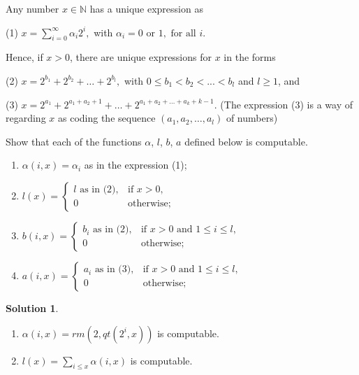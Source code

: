 \documentclass[12pt,a4paper]{article}
\theoremstyle{definition}
\newtheorem*{solution}{Solution}
\numberwithin{equation}{section}
\numberwithin{figure}{section}
\begin{document}
\begin{enumerate}
  Any number $x \in \mathbb{N}$ has a unique expression as

  (1) $x=\sum\limits_{i=0}^{\infty} \alpha_{i}2^{i},$ with $\alpha_{i}=0 \mbox{ or } 1,\mbox{ for all }i.$

  Hence, if $x>0$, there are unique expressions for  $x$ in the forms

  (2) $x=2^{b_{1}}+2^{b_{2}}+\ldots+2^{b_{l}},$ with $0\leq b_{1}<b_{2}<...<b_{l}$ and $l \geq 1$, and

  (3) $x=2^{a_{1}}+2^{a_{1}+a_{2}+1}+\ldots+2^{a_{1}+a_{2}+\ldots+a_{k}+k-1}$. %
  {\color{blue}(The expression (3) is a way of regarding $x$ as coding the sequence $(a_{1},a_{2},\ldots,a_{l})$ of numbers)}

  Show that each of the functions $\alpha$, $l$, $b$, $a$ defined below is computable.
    \begin{enumerate}
    \item $\alpha(i,x)=\alpha_{i}$ as in the expression (1);
    \item $l(x)=\left\{\begin{array}{ll}
        l \mbox{ as in (2)}, & \mbox{if } x>0,\\
        0& \mbox{otherwise};
        \end{array}\right.$
    \item $b(i,x)=\left\{\begin{array}{ll}
        b_{i} \mbox{ as in (2)}, &\mbox{if } x>0 \mbox{ and } 1\leq i \leq l,\\
        0& \mbox{otherwise};
        \end{array}\right.$
    \item $a(i,x)=\left\{\begin{array}{ll}
        a_{i} \mbox{ as in (3)}, &\mbox{if } x>0 \mbox{ and } 1\leq i \leq l,\\
        0& \mbox{otherwise};
        \end{array}\right.$
    \end{enumerate}
    
    \begin{solution}
    \begin{enumerate}
        
        \item $\alpha(i,x) = rm(2,qt(2^i,x))$ is computable.
        
        \item $l(x) =  \sum_{i\leq x} \alpha(i,x)$ is computable.
        

\end{enumerate}
\end{solution}
\end{enumerate}
\end{document}
